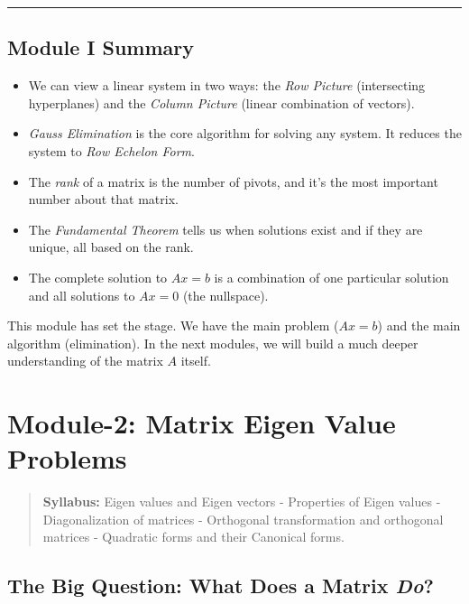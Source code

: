 \documentclass[
  letterpaper,
  DIV=11,
  numbers=noendperiod]{scrreprt}
\providecommand{\tightlist}{%
  \setlength{\itemsep}{0pt}\setlength{\parskip}{0pt}}
\begin{document}
\begin{center}\rule{0.5\linewidth}{0.5pt}\end{center}

\section{Module I Summary}\label{module-i-summary}

\begin{itemize}
\tightlist
\item
  We can view a linear system in two ways: the \emph{Row Picture}
  (intersecting hyperplanes) and the \emph{Column Picture} (linear
  combination of vectors).
\item
  \emph{Gauss Elimination} is the core algorithm for solving any system.
  It reduces the system to \emph{Row Echelon Form}.
\item
  The \emph{rank} of a matrix is the number of pivots, and it's the most
  important number about that matrix.
\item
  The \emph{Fundamental Theorem} tells us when solutions exist and if
  they are unique, all based on the rank.
\item
  The complete solution to \(Ax = b\) is a combination of one particular
  solution and all solutions to \(Ax = 0\) (the nullspace).
\end{itemize}

This module has set the stage. We have the main problem (\(Ax=b\)) and
the main algorithm (elimination). In the next modules, we will build a
much deeper understanding of the matrix \(A\) itself.


\chapter{Module-2: Matrix Eigen Value
Problems}\label{module-2-matrix-eigen-value-problems}

\begin{quote}
\textbf{Syllabus:} Eigen values and Eigen vectors - Properties of Eigen
values - Diagonalization of matrices - Orthogonal transformation and
orthogonal matrices - Quadratic forms and their Canonical forms.
\end{quote}

\section{\texorpdfstring{The Big Question: What Does a Matrix
\emph{Do}?}{The Big Question: What Does a Matrix Do?}}\label{the-big-question-what-does-a-matrix-do}
\end{document}
